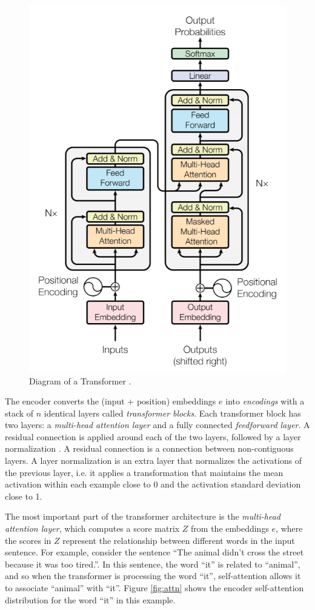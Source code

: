 \begin{figure}[!h]
 \centering
 \includegraphics[width=0.5\columnwidth]{imgs/background/transformer.png}
 \caption{Diagram of a Transformer \cite{vaswani2017attention}.}
 \label{fig:transformer}
\end{figure}

The encoder converts the (input + position) embeddings $e$ into \textit{encodings} with a stack of $n$ identical layers called \textit{transformer blocks}. Each transformer block has two layers: a \textit{multi-head attention layer} and a fully connected \textit{feedforward layer}. A residual connection \cite{he2016deep} is applied around each of the two layers, followed by a layer normalization \cite{ba2016layer}. A residual connection is a connection between non-contiguous layers. A layer normalization is an extra layer that normalizes the activations of the previous layer, i.e. it applies a transformation that maintains the mean activation within each example close to 0 and the activation standard deviation close to 1.

The most important part of the transformer architecture is the \textit{multi-head attention layer}, which computes a score matrix $Z$ from the embeddings $e$, where the scores in $Z$ represent the relationship between different words in the input sentence. For example, consider the sentence ``The animal didn't cross the street because it was too tired.''. In this sentence, the word ``it'' is related to ``animal'', and so when the transformer is processing the word ``it'', self-attention allows it to associate ``animal'' with ``it''. Figure \ref{fig:attn} shows the encoder self-attention distribution for the word ``it'' in this example.

